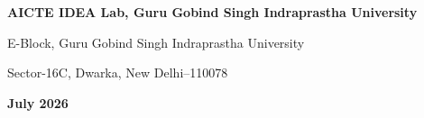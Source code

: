 \begin{titlepage}
\begin{center}
\vspace{0.45cm}

{\large\bfseries
AICTE IDEA Lab, Guru Gobind Singh Indraprastha University\par}

\vspace{0.12cm}

{\normalsize
E-Block, Guru Gobind Singh Indraprastha University\par}

\vspace{0.12cm}

{\normalsize
Sector-16C, Dwarka, New Delhi--110078\par}

\vspace{0.45cm}

{\large\bfseries July 2026\par}

\end{center}

\end{titlepage}
